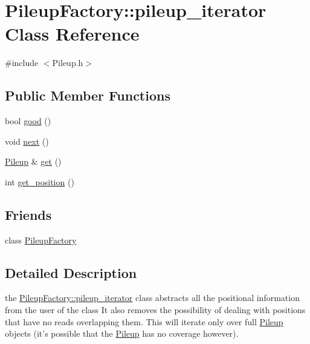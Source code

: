 \hypertarget{class_pileup_factory_1_1pileup__iterator}{
\section{PileupFactory::pileup\_\-iterator Class Reference}
\label{class_pileup_factory_1_1pileup__iterator}
}


{\ttfamily \#include $<$Pileup.h$>$}

\subsection*{Public Member Functions}
\begin{DoxyCompactItemize}
\item 
bool \hyperlink{class_pileup_factory_1_1pileup__iterator_a50cc0c2e2cc88ee53ca49e0c9af37abb}{good} ()
\item 
void \hyperlink{class_pileup_factory_1_1pileup__iterator_ae1b39c13e75befc882424cc2ba97d840}{next} ()
\item 
\hyperlink{class_pileup}{Pileup} \& \hyperlink{class_pileup_factory_1_1pileup__iterator_ae9b4c64e31955f28f65a5841e394add2}{get} ()
\item 
int \hyperlink{class_pileup_factory_1_1pileup__iterator_a1bf8e5041e0cbf9863820b7e9e2e2dc8}{get\_\-position} ()
\end{DoxyCompactItemize}
\subsection*{Friends}
\begin{DoxyCompactItemize}
\item 
\hypertarget{class_pileup_factory_1_1pileup__iterator_a432907b7bd4b655df9251d3c4ead752b}{
class \hyperlink{class_pileup_factory_1_1pileup__iterator_a432907b7bd4b655df9251d3c4ead752b}{PileupFactory}}
\label{class_pileup_factory_1_1pileup__iterator_a432907b7bd4b655df9251d3c4ead752b}

\end{DoxyCompactItemize}


\subsection{Detailed Description}
the \hyperlink{class_pileup_factory_1_1pileup__iterator}{PileupFactory::pileup\_\-iterator} class abstracts all the positional information from the user of the class It also removes the possibility of dealing with positions that have no reads overlapping them. This will iterate only over full \hyperlink{class_pileup}{Pileup} objects (it's possible that the \hyperlink{class_pileup}{Pileup} has no coverage however).

